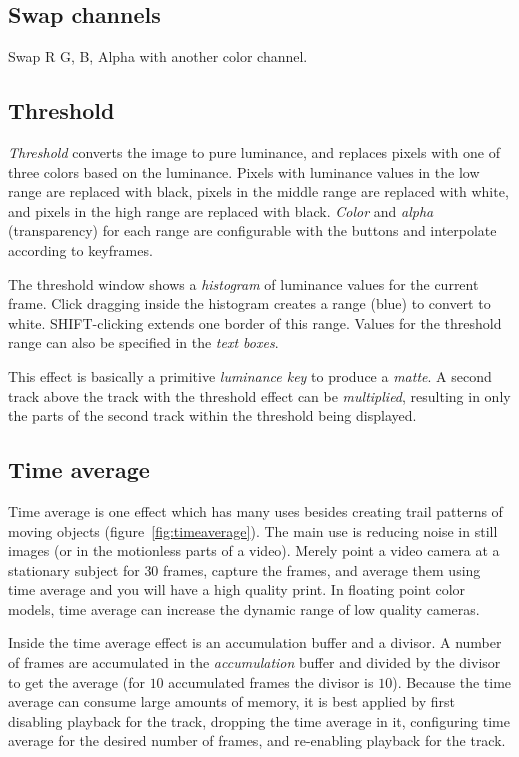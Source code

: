 {\subsection{Swap channels}%
\label{sub:swap_channels}

Swap R G, B, Alpha with another color channel.

\subsection{Threshold}%
\label{sub:threshold}

\textit{Threshold} converts the image to pure luminance, and replaces pixels with one of three colors based on the luminance. Pixels with luminance values in the low range are replaced with black, pixels in the middle range are replaced with white, and pixels in the high range are replaced with black. \textit{Color} and \textit{alpha} (transparency) for each range are configurable with the buttons and interpolate according to keyframes.

The threshold window shows a \textit{histogram} of luminance values for the current frame. Click dragging inside the histogram creates a range (blue) to convert to white. SHIFT-clicking extends one border of this range. Values for the threshold range can also be specified in the \textit{text boxes}.

This effect is basically a primitive \textit{luminance key} to produce a \textit{matte}. A second track above the track with the threshold effect can be \textit{multiplied}, resulting in only the parts of the second track within the threshold being displayed.

\subsection{Time average}%
\label{sub:time_average}

Time average is one effect which has many uses besides creating trail patterns of moving objects (figure~\ref{fig:timeaverage}).
The main use is reducing noise in still images (or in the motionless parts of a video). Merely point a video camera at a stationary subject for $30$ frames, capture the frames, and average them using time average and you will have a high quality print. In floating point color models, time average can increase the dynamic range of low quality cameras.

Inside the time average effect is an accumulation buffer and a divisor. A number of frames are accumulated in the \textit{accumulation} buffer and divided by the divisor to get the average (for $10$ accumulated frames the divisor is $10$). Because the time average can consume large amounts of memory, it is best applied by first disabling playback for the track, dropping the time average in it, configuring time average for the desired number of frames, and re-enabling playback for the track.

}
